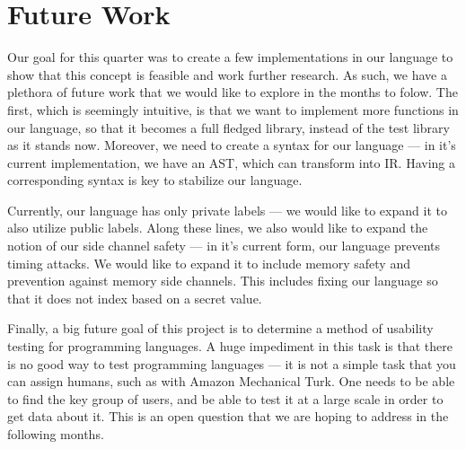 \section{Future Work}
\label{sec:future}

Our goal for this quarter was to create a few implementations in our language to
show that this concept is feasible and work further research. As such, we have a
plethora of future work that we would like to explore in the months to folow.
The first, which is seemingly intuitive, is that we want to implement more
functions in our language, so that it becomes a full fledged library, instead of
the test library as it stands now. Moreover, we need to create a syntax for our
language --- in it's current implementation, we have an AST, which can transform
into IR. Having a corresponding syntax is key to stabilize our language.

Currently, our language has only private labels --- we would like to expand it
to also utilize public labels. Along these lines, we also would like to expand
the notion of our side channel safety --- in it's current form, our language
prevents timing attacks. We would like to expand it to include memory safety and
prevention against memory side channels. This includes fixing our language so
that it does not index based on a secret value. 

Finally, a big future goal of this project is to determine a method of usability
testing for programming languages. A huge impediment in this task is that there
is no good way to test programming languages --- it is not a simple task that
you can assign humans, such as with Amazon Mechanical Turk\cite{mechanicalturk}. One needs to
be able to find the key group of users, and be able to test it at a large scale
in order to get data about it. This is an open question that we are hoping to
address in the following months.
